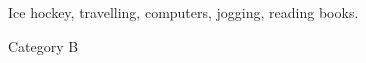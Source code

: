 



\begin{cvhonors}

  \cvhonor
    {} %
    {Ice hockey, travelling, computers, jogging, reading books.} %

\end{cvhonors}
\vspace{5pt}



\begin{cvhonors}

  \cvhonor
    {}%
    {Category B} %



\end{cvhonors}
\vspace{5pt}

